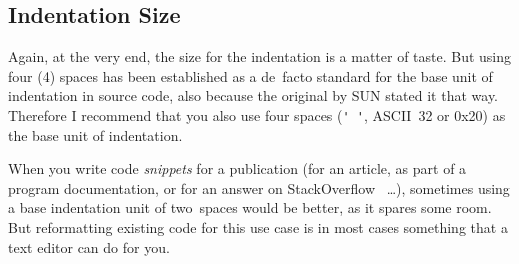 \subsection{Indentation Size}\label{sec:IndentationSize}
Again, at the very end, the size for the indentation is a matter of taste. But using four (4) spaces has been established as a de~facto standard for the base unit of indentation in \Java source code, also because the original \autocite{SUN_CODE_CONVENTIONS:Indentation} by SUN stated it that way. Therefore I recommend that you also use four spaces (\lstinline|' '|, ASCII~32 or 0x20) as the base unit of indentation.

When you write code \textit{snippets} for a publication (for an article, as part of a program documentation, or for an answer on StackOverflow \autocite{STACKOVERFLOW}~…), sometimes using a base indentation unit of two~spaces would be better, as it spares some room. But reformatting existing code for this use case is in most cases something that a text editor can do for you.